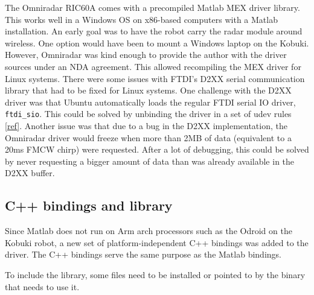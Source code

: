 The Omniradar RIC60A comes with a precompiled Matlab MEX driver library.
This works well in a Windows OS on x86-based computers with a Matlab
installation. An early goal was to have the robot carry the radar module
around wireless. One option would have been to mount a Windows laptop on
the Kobuki. However, Omniradar was kind enough to provide the author
with the driver sources under an NDA agreement. This allowed recompiling
the MEX driver for Linux systems. There were some issues with FTDI's
D2XX serial communication library that had to be fixed for Linux
systems. One challenge with the D2XX driver was that Ubuntu
automatically loads the regular FTDI serial IO driver,
\texttt{ftdi\_sio}. This could be solved by unbinding the driver in a
set of udev rules
\href{https://stackoverflow.com/questions/44529376}{{[}ref{]}}. Another
issue was that due to a bug in the D2XX implementation, the Omniradar
driver would freeze when more than 2MB of data (equivalent to a 20ms
FMCW chirp) were requested. After a lot of debugging, this could be
solved by never requesting a bigger amount of data than was already
available in the D2XX buffer.

\subsection{C++ bindings and library}\label{c-bindings-and-library}

Since Matlab does not run on Arm arch processors such as the Odroid on
the Kobuki robot, a new set of platform-independent C++ bindings was
added to the driver. The C++ bindings serve the same purpose as the
Matlab bindings.

To include the library, some files need to be installed or pointed to by
the binary that needs to use it.

